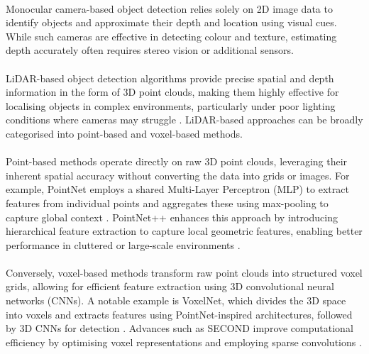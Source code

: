 \paragraph*{} Monocular camera-based object detection relies solely on 2D image data to identify objects and approximate their depth and location using visual cues. While such cameras are effective in detecting colour and texture, estimating depth accurately often requires stereo vision or additional sensors.

\paragraph*{} LiDAR-based object detection algorithms provide precise spatial and depth information in the form of 3D point clouds, making them highly effective for localising objects in complex environments, particularly under poor lighting conditions where cameras may struggle \cite{geiger2013vision}. LiDAR-based approaches can be broadly categorised into point-based and voxel-based methods.

\paragraph*{} Point-based methods operate directly on raw 3D point clouds, leveraging their inherent spatial accuracy without converting the data into grids or images. For example, PointNet employs a shared Multi-Layer Perceptron (MLP) to extract features from individual points and aggregates these using max-pooling to capture global context \cite{qi2017pointnet}. PointNet++ enhances this approach by introducing hierarchical feature extraction to capture local geometric features, enabling better performance in cluttered or large-scale environments \cite{qi2017pointnet++}.

\paragraph*{} Conversely, voxel-based methods transform raw point clouds into structured voxel grids, allowing for efficient feature extraction using 3D convolutional neural networks (CNNs). A notable example is VoxelNet, which divides the 3D space into voxels and extracts features using PointNet-inspired architectures, followed by 3D CNNs for detection \cite{zhou2018voxelnet}. Advances such as SECOND improve computational efficiency by optimising voxel representations and employing sparse convolutions \cite{yan2018second}.

